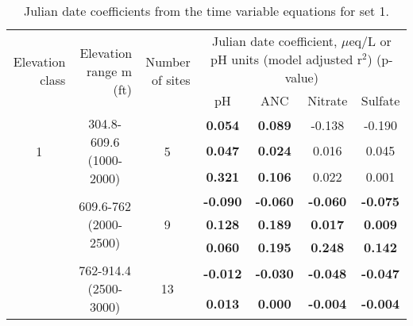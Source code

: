 \begin{table}[htbp]
  \centering
  \caption{Julian date coefficients from the time variable equations for set 1.}
    \begin{tabular}{rrrcccc}
\toprule
    \multirow{3}[4]{2cm}{Elevation class} & \multirow{3}[4]{2.5cm}{Elevation range m (ft)} & \multirow{3}[4]{2cm}{Number of sites} & \multicolumn{4}{c}{\multirow{2}[2]{7cm}{Julian date coefficient, $\mu$eq/L or pH units (model adjusted r$^2$) (p-value)}} \\ 
          &       &       & \multicolumn{4}{c}{}\bigstrut\\\cline{4-7}\noalign{\smallskip}
          &       &       & pH    & ANC   & Nitrate & Sulfate \\
\midrule
    \multicolumn{1}{c}{\multirow{3}[2]{*}{1}} & \multicolumn{1}{c}{\multirow{3}[2]{2.5cm}{304.8-609.6 (1000-2000)}} & \multicolumn{1}{c}{\multirow{3}[2]{*}{5}} & \textbf{0.054 } & \textbf{0.089 } & -0.138  & -0.190  \\
    \multicolumn{1}{c}{} & \multicolumn{1}{c}{} & \multicolumn{1}{c}{} & \textbf{0.047 } & \textbf{0.024 } & 0.016  & 0.045  \\
    \multicolumn{1}{c}{} & \multicolumn{1}{c}{} & \multicolumn{1}{c}{} & \textbf{0.321 } & \textbf{0.106 } & 0.022  & 0.001  \bigstrut\\\cline{4-7}\noalign{\smallskip}
    \multicolumn{1}{c}{\multirow{3}[2]{*}{2}} & \multicolumn{1}{c}{\multirow{3}[2]{2.5cm}{609.6-762 (2000-2500)}} & \multicolumn{1}{c}{\multirow{3}[2]{*}{9}} & \textbf{-0.090 } & \textbf{-0.060 } & \textbf{-0.060 } & \textbf{-0.075 } \\
    \multicolumn{1}{c}{} & \multicolumn{1}{c}{} & \multicolumn{1}{c}{} & \textbf{0.128 } & \textbf{0.189 } & \textbf{0.017 } & \textbf{0.009 } \\
    \multicolumn{1}{c}{} & \multicolumn{1}{c}{} & \multicolumn{1}{c}{} & \textbf{0.060 } & \textbf{0.195 } & \textbf{0.248 } & \textbf{0.142 } \bigstrut\\\cline{4-7}\noalign{\smallskip}
    \multicolumn{1}{c}{\multirow{3}[2]{*}{3}} & \multicolumn{1}{c}{\multirow{3}[2]{2.5cm}{762-914.4 (2500-3000)}} & \multicolumn{1}{c}{\multirow{3}[2]{*}{13}} & \textbf{-0.012 } & \textbf{-0.030 } & \textbf{-0.048 } & \textbf{-0.047 } \\
    \multicolumn{1}{c}{} & \multicolumn{1}{c}{} & \multicolumn{1}{c}{} & \textbf{0.013 } & \textbf{0.000 } & \textbf{-0.004 } & \textbf{-0.004 } \\

\end{tabular}
\end{table}
